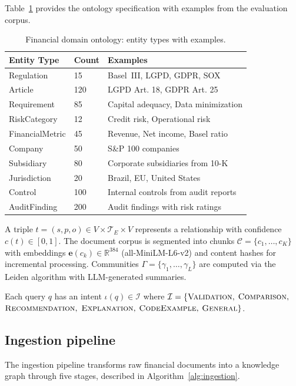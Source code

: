 \documentclass[review]{elsarticle}
\begin{document}
Table~\ref{tab:ontology} provides the ontology specification with examples from the evaluation corpus.

\begin{table}[t]
\caption{Financial domain ontology: entity types with examples.}
\label{tab:ontology}
\centering
\small
\begin{tabular}{@{}llp{5cm}@{}}
\toprule
\textbf{Entity Type} & \textbf{Count} & \textbf{Examples} \\
\midrule
Regulation & 15 & Basel~III, LGPD, GDPR, SOX \\
Article & 120 & LGPD Art. 18, GDPR Art. 25 \\
Requirement & 85 & Capital adequacy, Data minimization \\
RiskCategory & 12 & Credit risk, Operational risk \\
FinancialMetric & 45 & Revenue, Net income, Basel ratio \\
Company & 50 & S\&P 100 companies \\
Subsidiary & 80 & Corporate subsidiaries from 10-K \\
Jurisdiction & 20 & Brazil, EU, United States \\
Control & 100 & Internal controls from audit reports \\
AuditFinding & 200 & Audit findings with risk ratings \\
\bottomrule
\end{tabular}
\end{table}

A triple $t = (s, p, o) \in V \times \mathcal{T}_E \times V$ represents a relationship with confidence $c(t) \in [0, 1]$. The document corpus is segmented into chunks $\mathcal{C} = \{c_1, \ldots, c_K\}$ with embeddings $\mathbf{e}(c_k) \in \mathbb{R}^{384}$ (all-MiniLM-L6-v2) and content hashes for incremental processing. Communities $\Gamma = \{\gamma_1, \ldots, \gamma_L\}$ are computed via the Leiden algorithm with LLM-generated summaries.

Each query $q$ has an intent $\iota(q) \in \mathcal{I}$ where $\mathcal{I} = \{\textsc{Validation},$ $\textsc{Comparison},$ $\textsc{Recommendation},$ $\textsc{Explanation},$ $\textsc{CodeExample},$ $\textsc{General}\}$.

\subsection{Ingestion pipeline}
\label{sec:ingestion}

The ingestion pipeline transforms raw financial documents into a knowledge graph through five stages, described in Algorithm~\ref{alg:ingestion}.
\end{document}
